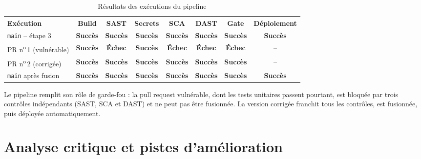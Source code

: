 \documentclass[11pt,a4paper]{article}
\newcommand{\ok}{\textcolor{vert}{\textbf{Succès}}}
\newcommand{\ko}{\textcolor{rouge}{\textbf{Échec}}}
\begin{document}
\begin{table}[H]
\centering
\caption{Résultats des exécutions du pipeline}
\label{tab:resultats}
\small
\begin{tabular}{l c c c c c c c}
\toprule
\textbf{Exécution} & \textbf{Build} & \textbf{SAST} & \textbf{Secrets} & \textbf{SCA} & \textbf{DAST} & \textbf{Gate} & \textbf{Déploiement} \\
\midrule
\texttt{main} -- étape 3          & \ok & \ok & \ok & \ok & \ok & \ok & \ok \\
PR n\textsuperscript{o}\,1 (vulnérable) & \ok & \ko & \ok & \ko & \ko & \ko & -- \\
PR n\textsuperscript{o}\,2 (corrigée)   & \ok & \ok & \ok & \ok & \ok & \ok & -- \\
\texttt{main} après fusion        & \ok & \ok & \ok & \ok & \ok & \ok & \ok \\
\bottomrule
\end{tabular}
\end{table}

\begin{bilan}
Le pipeline remplit son rôle de garde-fou : la pull request vulnérable, dont les tests unitaires
passent pourtant, est bloquée par trois contrôles indépendants (SAST, SCA et DAST) et ne peut pas
être fusionnée. La version corrigée franchit tous les contrôles, est fusionnée, puis déployée
automatiquement.
\end{bilan}

\section{Analyse critique et pistes d'amélioration}
\end{document}
